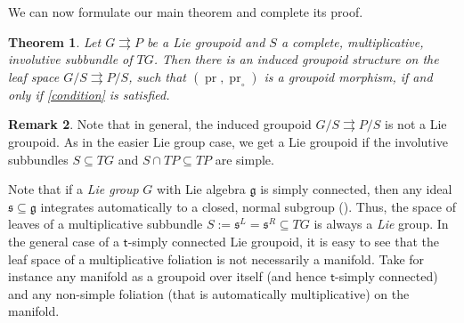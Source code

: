 \documentclass{amsart}
\newtheorem{theorem}{Theorem}[section]
\theoremstyle{definition}
\newtheorem{remark}[theorem]{Remark}
\begin{document}
We can now formulate our main theorem and complete its proof. 
\begin{theorem}\label{groupoid_leaf_space}
Let $G{{\rightrightarrows}} P$ be a  Lie groupoid
and $S$ a complete, multiplicative, involutive subbundle 
of $TG$. 
Then there is an induced groupoid structure
on the leaf space $G/S{{\rightrightarrows}} P/S$, such that 
$(\operatorname{pr},\operatorname{pr}_\circ)$ is a groupoid morphism, if and only if
\eqref{condition} is satisfied.
\end{theorem}
\begin{remark}
 Note that in general, the induced groupoid $G/S{{\rightrightarrows}} P/S$ is not a Lie groupoid.
As in the easier Lie group case, we get a Lie groupoid if the 
involutive subbundles $S\subseteq TG$ and $S\cap TP\subseteq TP$ are simple.

Note that if a \emph{Lie group} $G$ with Lie algebra ${\mathfrak{g}}$ is simply connected, then 
any ideal ${\mathfrak{s}}\subseteq {\mathfrak{g}}$  integrates automatically to a closed, normal subgroup (\cite{HiNe91}).
Thus, the space of leaves of a multiplicative subbundle $S:={\mathfrak{s}}^L={\mathfrak{s}}^R\subseteq TG$
is always a \emph{Lie} group. In the general case of a ${{\mathsf{t}}}$-simply connected Lie groupoid, 
it is easy to see that
  the leaf  space of a multiplicative foliation is not necessarily a manifold. Take for instance
any manifold as a groupoid over itself  (and hence ${{\mathsf{t}}}$-simply connected) and any non-simple foliation
 (that is automatically multiplicative) on the manifold.
\end{remark}
\end{document}
